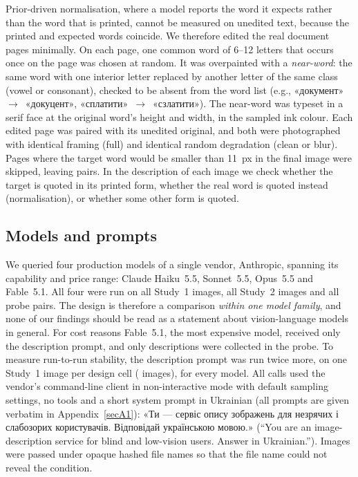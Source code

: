 Prior-driven normalisation, where a model reports the word it expects rather than the word that is printed, cannot be measured on unedited text, because the printed and expected words coincide. We therefore edited the real document pages minimally. On each page, one common word of 6--12 letters that occurs once on the page was chosen at random. It was overpainted with a \emph{near-word}: the same word with one interior letter replaced by another letter of the same class (vowel or consonant), checked to be absent from the word list (e.g., \foreignlanguage{ukrainian}{«документ»}~$\to$~\foreignlanguage{ukrainian}{«докуцент»}, \foreignlanguage{ukrainian}{«сплатити»}~$\to$~\foreignlanguage{ukrainian}{«сзлатити»}). The near-word was typeset in a serif face at the original word's height and width, in the sampled ink colour. Each edited page was paired with its unedited original, and both were photographed with identical framing (full) and identical random degradation (clean or blur). Pages where the target word would be smaller than 11~px in the final image were skipped, leaving \NProbePairs{} pairs. In the description of each image we check whether the target is quoted in its printed form, whether the real word is quoted instead (normalisation), or whether some other form is quoted.

\subsection{Models and prompts}\label{sec:models}

We queried four production models of a single vendor, Anthropic, spanning its capability and price range: Claude Haiku~5.5, Sonnet~5.5, Opus~5.5 and Fable~5.1. All four were run on all \NImages{} Study~1 images, all \RealNImages{} Study~2 images and all probe pairs. The design is therefore a comparison \emph{within one model family}, and none of our findings should be read as a statement about vision-language models in general. For cost reasons Fable~5.1, the most expensive model, received only the description prompt, and only descriptions were collected in the probe. To measure run-to-run stability, the description prompt was run twice more, on one Study~1 image per design cell (\StabN{} images), for every model. All calls used the vendor's command-line client in non-interactive mode with default sampling settings, no tools and a short system prompt in Ukrainian (all prompts are given verbatim in Appendix~\ref{secA1}): \foreignlanguage{ukrainian}{«Ти — сервіс опису зображень для незрячих і слабозорих користувачів. Відповідай українською мовою.»} (``You are an image-description service for blind and low-vision users. Answer in Ukrainian.''). Images were passed under opaque hashed file names so that the file name could not reveal the condition.

